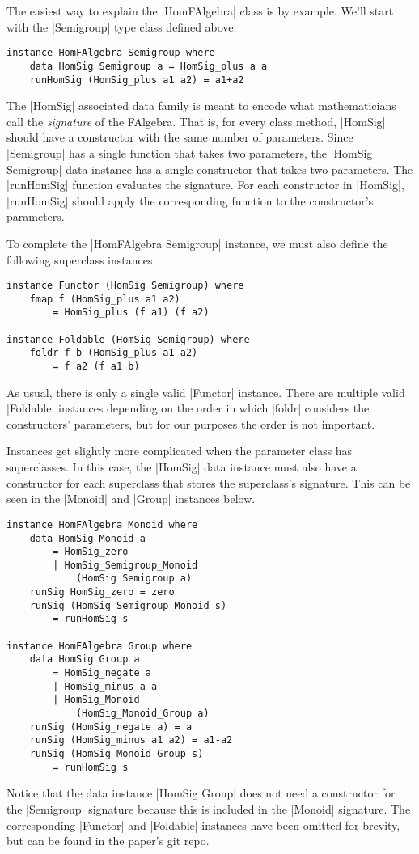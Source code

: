 \documentclass[preprint]{sigplanconf}
\theoremstyle{definition}
\begin{document}
The easiest way to explain the |HomFAlgebra| class is by example.
We'll start with the |Semigroup| type class defined above.
\begin{lstlisting}
instance HomFAlgebra Semigroup where
    data HomSig Semigroup a = HomSig_plus a a
    runHomSig (HomSig_plus a1 a2) = a1+a2
\end{lstlisting}
The |HomSig| associated data family is meant to encode what mathematicians call the \emph{signature} of the FAlgebra.
That is, for every class method, |HomSig| should have a constructor with the same number of parameters.
Since |Semigroup| has a single function that takes two parameters,
the |HomSig Semigroup| data instance has a single constructor that takes two parameters.
The |runHomSig| function evaluates the signature.
For each constructor in |HomSig|, |runHomSig| should apply the corresponding function to the constructor's parameters.

To complete the |HomFAlgebra Semigroup| instance, we must also define the following superclass instances.
\begin{lstlisting}
instance Functor (HomSig Semigroup) where
    fmap f (HomSig_plus a1 a2)
        = HomSig_plus (f a1) (f a2)

instance Foldable (HomSig Semigroup) where
    foldr f b (HomSig_plus a1 a2)
        = f a2 (f a1 b)
\end{lstlisting}
As usual, there is only a single valid |Functor| instance.
There are multiple valid |Foldable| instances depending on the order in which |foldr| considers the constructors' parameters,
but for our purposes the order is not important.

Instances get slightly more complicated when the parameter class has superclasses.
In this case, the |HomSig| data instance must also have a constructor for each superclass that stores the superclass's signature.
This can be seen in the |Monoid| and |Group| instances below.
\begin{lstlisting}
instance HomFAlgebra Monoid where
    data HomSig Monoid a
        = HomSig_zero
        | HomSig_Semigroup_Monoid
            (HomSig Semigroup a)
    runSig HomSig_zero = zero
    runSig (HomSig_Semigroup_Monoid s)
        = runHomSig s

instance HomFAlgebra Group where
    data HomSig Group a
        = HomSig_negate a
        | HomSig_minus a a
        | HomSig_Monoid
            (HomSig_Monoid_Group a)
    runSig (HomSig_negate a) = a
    runSig (HomSig_minus a1 a2) = a1-a2
    runSig (HomSig_Monoid_Group s)
        = runHomSig s
\end{lstlisting}
Notice that the data instance |HomSig Group| does not need a constructor for the |Semigroup| signature because this is included in the |Monoid| signature.
The corresponding |Functor| and |Foldable| instances have been omitted for brevity,
but can be found in the paper's git repo.
\end{document}
